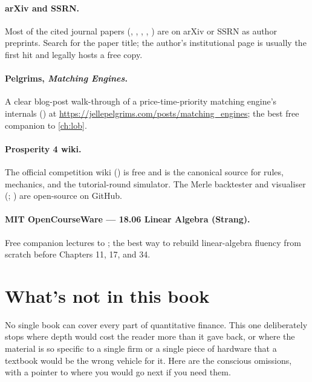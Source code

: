 \paragraph{arXiv and SSRN.} Most of the cited journal papers
(\citealp{avellaneda2008high}, \citealp{almgren2000optimal},
\citealp{avellaneda2010stat}, \citealp{bailey2014deflated},
\citealp{moskowitz2012time}) are on arXiv or SSRN as author
preprints. Search for the paper title; the author's institutional
page is usually the first hit and legally hosts a free copy.

\paragraph{Pelgrims, \emph{Matching Engines}.} A clear blog-post
walk-through of a price-time-priority matching engine's internals
(\citealp{pelgrims2020matching}) at
\url{https://jellepelgrims.com/posts/matching_engines}; the best
free companion to \cref{ch:lob}.

\paragraph{Prosperity 4 wiki.} The official competition wiki
(\citealp{prosperity4wiki}) is free and is the canonical source for
rules, mechanics, and the tutorial-round simulator. The Merle
backtester and visualiser (\citealp{jmerle_backtester};
\citealp{jmerle_visualiser}) are open-source on GitHub.

\paragraph{MIT OpenCourseWare --- 18.06 Linear Algebra (Strang).}
Free companion lectures to \citet{strang2016linalg}; the best way to
rebuild linear-algebra fluency from scratch before Chapters 11, 17,
and 34.

\section{What's not in this book}
\label{sec:app_biblio_gaps}

No single book can cover every part of quantitative finance. This one
deliberately stops where depth would cost the reader more than it
gave back, or where the material is so specific to a single firm or a
single piece of hardware that a textbook would be the wrong vehicle
for it. Here are the conscious omissions, with a pointer to where
you would go next if you need them.

